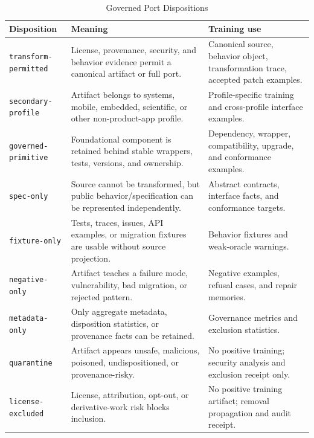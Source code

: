 \begin{table}[t]
\caption{Governed Port Dispositions}
\label{tab:dispositions}
\centering
\scriptsize
\begin{tabularx}{\textwidth}{p{}X X}
\toprule
Disposition & Meaning & Training use \\
\midrule
\texttt{transform-permitted} & License, provenance, security, and behavior evidence permit a canonical artifact or full port. & Canonical source, behavior object, transformation trace, accepted patch examples. \\
\texttt{secondary-profile} & Artifact belongs to systems, mobile, embedded, scientific, or other non-product-app profile. & Profile-specific training and cross-profile interface examples. \\
\texttt{governed-primitive} & Foundational component is retained behind stable wrappers, tests, versions, and ownership. & Dependency, wrapper, compatibility, upgrade, and conformance examples. \\
\texttt{spec-only} & Source cannot be transformed, but public behavior/specification can be represented independently. & Abstract contracts, interface facts, and conformance targets. \\
\texttt{fixture-only} & Tests, traces, issues, API examples, or migration fixtures are usable without source projection. & Behavior fixtures and weak-oracle warnings. \\
\texttt{negative-only} & Artifact teaches a failure mode, vulnerability, bad migration, or rejected pattern. & Negative examples, refusal cases, and repair memories. \\
\texttt{metadata-only} & Only aggregate metadata, disposition statistics, or provenance facts can be retained. & Governance metrics and exclusion statistics. \\
\texttt{quarantine} & Artifact appears unsafe, malicious, poisoned, undispositioned, or provenance-risky. & No positive training; security analysis and exclusion receipt only. \\
\texttt{license-excluded} & License, attribution, opt-out, or derivative-work risk blocks inclusion. & No positive training artifact; removal propagation and audit receipt. \\
\bottomrule
\end{tabularx}
\end{table}

